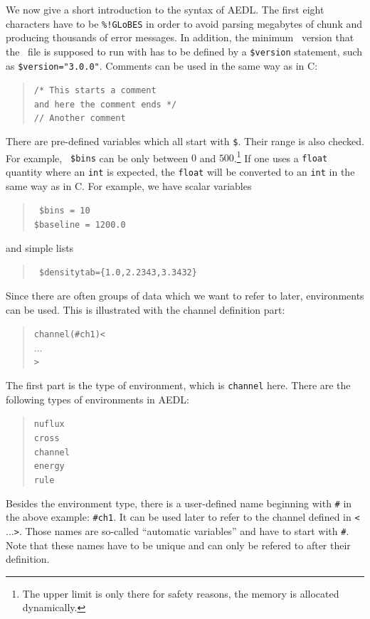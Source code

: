 We now give a short introduction to the syntax of AEDL.
 The first eight characters have to be {\tt \%!GLoBES}
in order to avoid parsing megabytes of chunk
 and producing thousands of error messages.  In addition, the minimum
\GLOBES\ version that the \AEDL\ file is supposed to run with has to be
defined by a {\tt \$version} statement, such as
{\tt \$version="3.0.0"}.
%
Comments can be used in the same way as in C:
\begin{quote}
{\tt /* This starts a comment\\
 and here the comment ends */ \\
// Another comment
}
\end{quote}
There are pre-defined variables which all start with {\tt \$}. Their range
is also checked. For example,  {\tt 
\$bins} can be only between $0$ and $500$.\footnote{The upper limit is 
only there for safety reasons, the memory is allocated dynamically.} If one uses a {\tt float} quantity where  an {\tt int} is expected, the {\tt float} will be converted to an {\tt int} in the same way as in C.  For example, we have scalar variables
\begin{quote}
{\tt
\$bins = 10\\
\$baseline = 1200.0
}
\end{quote}
and simple lists
\begin{quote}
{\tt
\$densitytab=\{1.0,2.2343,3.3432\} 
}
\end{quote}
%
Since there are often groups of data which we want to refer to later,
environments can be used. This is illustrated 
with the channel definition part:
\begin{quote}
{\tt channel(\#ch1)<\\
\tb  $\ldots$\\
>
}
\end{quote}
The first part is the type of environment, which is {\tt channel} here. 
There are the following types of environments in AEDL:
\begin{quote}
{\tt nuflux\\
cross\\
channel\\
energy\\
rule
}
\end{quote}
Besides the environment type, there is a user-defined name 
beginning with {\tt \#}
in the above example: {\tt \#ch1}. It can be used later to refer to the 
channel defined in {\tt <$\ldots$>}. Those names are so-called 
``automatic variables'' and have to start with {\tt \#}. Note that these names have to be unique and can only be refered to after their definition.
